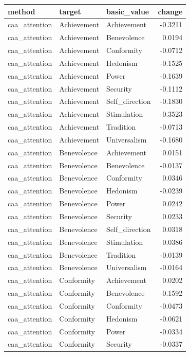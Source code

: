 \begin{tabular}{lllr}
\toprule
method & target & basic\_value & change \\
\midrule
caa\_attention & Achievement & Achievement & -0.3211 \\
caa\_attention & Achievement & Benevolence & 0.0194 \\
caa\_attention & Achievement & Conformity & -0.0712 \\
caa\_attention & Achievement & Hedonism & -0.1525 \\
caa\_attention & Achievement & Power & -0.1639 \\
caa\_attention & Achievement & Security & -0.1112 \\
caa\_attention & Achievement & Self\_direction & -0.1830 \\
caa\_attention & Achievement & Stimulation & -0.3523 \\
caa\_attention & Achievement & Tradition & -0.0713 \\
caa\_attention & Achievement & Universalism & -0.1680 \\
caa\_attention & Benevolence & Achievement & 0.0151 \\
caa\_attention & Benevolence & Benevolence & -0.0137 \\
caa\_attention & Benevolence & Conformity & 0.0346 \\
caa\_attention & Benevolence & Hedonism & -0.0239 \\
caa\_attention & Benevolence & Power & 0.0242 \\
caa\_attention & Benevolence & Security & 0.0233 \\
caa\_attention & Benevolence & Self\_direction & 0.0318 \\
caa\_attention & Benevolence & Stimulation & 0.0386 \\
caa\_attention & Benevolence & Tradition & -0.0139 \\
caa\_attention & Benevolence & Universalism & -0.0164 \\
caa\_attention & Conformity & Achievement & 0.0202 \\
caa\_attention & Conformity & Benevolence & -0.1592 \\
caa\_attention & Conformity & Conformity & -0.0473 \\
caa\_attention & Conformity & Hedonism & -0.0621 \\
caa\_attention & Conformity & Power & -0.0334 \\
caa\_attention & Conformity & Security & -0.0337 \\

\end{tabular}
